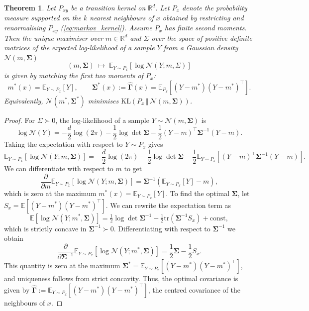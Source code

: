 \documentclass[10pt,a4paper]{amsart}
\newtheorem{theorem}{Theorem}
\newcommand{\E}{\mathbb{E}}
\newcommand{\G}{\widehat{\mathbf{\Gamma}}}
\newcommand{\N}{\mathcal{N}}
\newcommand{\Si}{\mathbf{\Sigma}}
\begin{document}
\begin{theorem} \label{optimalGM}
Let $P_{xy}$ be a transition kernel on $\mathbb{R}^d$. Let $P_x$ denote the probability measure supported on the $k$ nearest neighbours of $x$ obtained by restricting and renormalising $P_{xy}$ (\ref{eq:markov_kernel}).
Assume $P_x$ has finite second moments.
Then the unique maximiser over $m\in\mathbb{R}^d$ and $\Sigma$ over the space of positive definite matrices of the expected log-likelihood of a sample $Y$ from a Gaussian density \( \N(m, \Si) \)
\[
(m,\Si) \;\longmapsto\; \E_{Y\sim P_x}\!\left[\log \mathcal{N}(Y; m,\Sigma)\right]
\]
is given by matching the first two moments of \( P_x \):
\[
m^*(x)=\E_{Y\sim P_x}[Y],
\qquad
\Si^*(x):= \G(x) = \E_{P_x}\!\left[(Y-m^*)(Y-m^*)^\top\right].
\]
Equivalently, $\mathcal{N}(m^*,\Si^*)$ minimises $\mathrm{KL}(P_x\,\Vert\,\mathcal{N}(m,\Si))$.

\end{theorem}

\begin{proof}
For $\Sigma\succ0$, the log-likelihood of a sample $Y\sim \mathcal{N}(m, \Si)$ is
\[
\log \N(Y) = -\frac{d}{2}\log(2\pi) - \frac{1}{2}\log\det \Si - \frac{1}{2}(Y - m)^\top \Si^{-1} (Y - m).
\]
Taking the expectation with respect to $Y \sim P_x$ gives
\[
\E_{Y \sim P_x}\left[\log \N(Y; m, \Si)\right] = -\frac{d}{2}\log(2\pi) - \frac{1}{2}\log \det\Si - \frac{1}{2}\E_{Y \sim P_x}\left[(Y - m)^\top \Si^{-1} (Y - m)\right].
\]
We can differentiate with respect to $m$ to get
\[
\frac{\partial}{\partial m} \E_{Y \sim P_x}\left[\log \N(Y; m, \Si)\right] = \Si^{-1} (\E_{Y \sim P_x}[Y] - m),
\]
which is zero at the maximum $m^*(x) = \E_{Y \sim P_x}[Y]$.
To find the optimal $\Si$, let $S_x=\E[(Y-m^*)(Y-m^*)^\top]$. We can rewrite the expectation term as 
\[
\E[\log \mathcal{N}(Y;m^*,\Si)]
= \tfrac{1}{2}\log\det\Si^{-1} - \tfrac{1}{2}\mathrm{tr}(\Si^{-1} S_x) + \text{const},
\]
which is strictly concave in $\Si^{-1}\succ0$.
Differentiating with respect to $\Si^{-1}$ we obtain
\[
\frac{\partial}{\partial \Si^{-1}} \E_{Y \sim P_x}\left[\log \N(Y; m^*, \Si)\right] = \frac{1}{2}\Si - \frac{1}{2}S_x.
\]
This quantity is zero at the maximum $\Si^* = \E_{Y \sim P_x}\left[(Y - m^*)(Y - m^*)^\top\right]$, and uniqueness follows from strict concavity. 
Thus, the optimal covariance is given by $\G := \E_{Y \sim P_x}\left[(Y - m^*)(Y - m^*)^\top\right]$, the centred covariance of the neighbours of $x$.
\end{proof}
\end{document}
